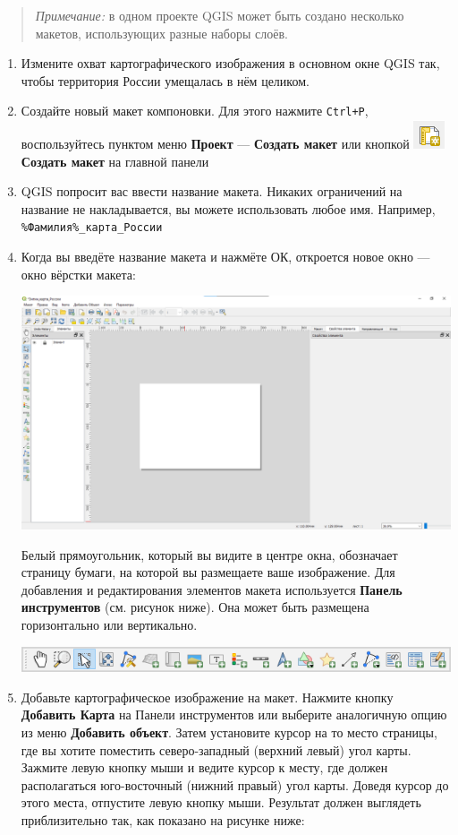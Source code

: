 \documentclass[
  12pt,
]{book}
\begin{document}
\begin{quote}
\emph{Примечание:} в одном проекте QGIS может быть создано несколько макетов, использующих разные наборы слоёв.
\end{quote}

\begin{enumerate}
\def\labelenumi{\arabic{enumi}.}
\item
  Измените охват картографического изображения в основном окне QGIS так, чтобы территория России умещалась в нём целиком.
\item
  Создайте новый макет компоновки. Для этого нажмите \texttt{Ctrl+P}, воспользуйтесь пунктом меню \textbf{Проект} --- \textbf{Создать макет} или кнопкой \includegraphics{images/Ex03/LayoutButton.png} \textbf{Создать макет} на главной панели
\item
  QGIS попросит вас ввести название макета. Никаких ограничений на название не накладывается, вы можете использовать любое имя. Например, \texttt{\%Фамилия\%\_карта\_России}
\item
  Когда вы введёте название макета и нажмёте ОК, откроется новое окно --- окно вёрстки макета:

  \includegraphics{images/Ex03/LayoutBlank.png}

  Белый прямоугольник, который вы видите в центре окна, обозначает страницу бумаги, на которой вы размещаете ваше изображение. Для добавления и редактирования элементов макета используется \textbf{Панель инструментов} (см. рисунок ниже). Она может быть размещена горизонтально или вертикально.

  \includegraphics{images/Ex03/LayoutToolbar.png}
\item
  Добавьте картографическое изображение на макет. Нажмите кнопку \textbf{Добавить Карта} на Панели инструментов или выберите аналогичную опцию из меню \textbf{Добавить объект}. Затем установите курсор на то место страницы, где вы хотите поместить северо-западный (верхний левый) угол карты. Зажмите левую кнопку мыши и ведите курсор к месту, где должен располагаться юго-восточный (нижний правый) угол карты. Доведя курсор до этого места, отпустите левую кнопку мыши. Результат должен выглядеть приблизительно так, как показано на рисунке ниже:


\end{enumerate}
\end{document}
